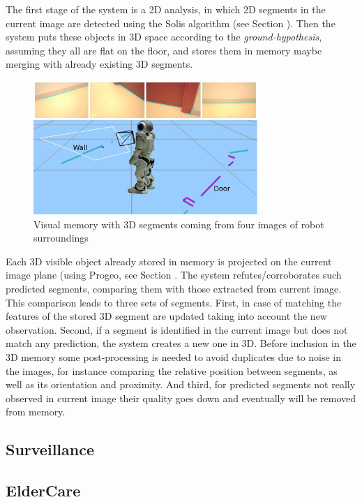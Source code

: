 \documentclass[twocolumn]{svjour3}          %
\begin{document}
The first stage of the system is a 2D analysis, in which 2D segments in the current image are detected using the Solis algorithm \cite{solis09} (see Section \label{subsec:visionlib}). Then the system puts these objects in 3D space according to the \textit{ground-hypothesis}, assuming they all are flat on the floor, and stores them in memory maybe merging with already existing 3D segments. 

\begin{figure}[h!]
\includegraphics[width=8.5cm]{figs/experimentoReal.jpg}
\caption{Visual memory with 3D segments coming from four images of robot surroundings}
\label{fig:memory}
\end{figure}

Each 3D visible object already stored in memory is projected on the current image plane (using Progeo, see Section \label{subsec:progeo}. The system refutes/corroborates such predicted segments, comparing them with those extracted from current image. This comparison leads to three sets of segments. First, in case of matching the features of the stored 3D segment are updated taking into account the new observation. Second, if a segment is identified in the current image but does not match any prediction, the system creates a new one in 3D. Before inclusion in the 3D memory some post-processing is needed to avoid duplicates due to noise in the images, for instance comparing the relative position between segments, as well as its orientation and proximity. And third, for predicted segments not really observed in current image their quality goes down and eventually will be removed from memory.

\subsection{Surveillance}

\subsection{ElderCare}
\end{document}

